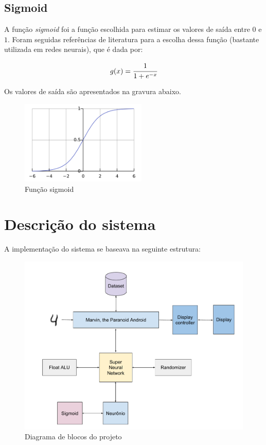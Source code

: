     \subsection{Sigmoid}
        A função \textit{sigmoid} foi a função escolhida para estimar os valores de saída entre $0$ e $1$. Foram seguidas referências de literatura para a escolha dessa função (bastante utilizada em redes neurais), que é dada por:

        \begin{equation}
            g(x) = \cfrac{1}{1 + e^{-x}}
        \end{equation}

        Os valores de saída são apresentados na gravura abaixo.

        \begin{figure}[ht!]
          \centering
          \includegraphics[width=6cm]{figures/sigmoid}
          \caption{Função sigmoid}
          \label{fig:arch}
        \end{figure}


\section{Descrição do sistema}
    A implementação do sistema se baseava na seguinte estrutura:

    \begin{figure}[ht!]
      \centering
      \includegraphics[width=12cm]{figures/blk_d}
      \caption{Diagrama de blocos do projeto}
      \label{fig:arch}
    \end{figure}

